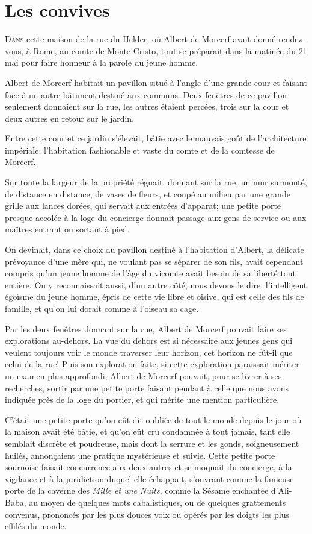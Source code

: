 \chapter{Les convives}

\lettrine{D}{ans} cette maison de la rue du Helder, où Albert de Morcerf avait donné rendez-vous, à Rome, au comte de Monte-Cristo, tout se préparait dans la matinée du 21 mai pour faire honneur à la parole du jeune homme. 

Albert de Morcerf habitait un pavillon situé à l'angle d'une grande cour et faisant face à un autre bâtiment destiné aux communs. Deux fenêtres de ce pavillon seulement donnaient sur la rue, les autres étaient percées, trois sur la cour et deux autres en retour sur le jardin. 

Entre cette cour et ce jardin s'élevait, bâtie avec le mauvais goût de l'architecture impériale, l'habitation fashionable et vaste du comte et de la comtesse de Morcerf. 

Sur toute la largeur de la propriété régnait, donnant sur la rue, un mur surmonté, de distance en distance, de vases de fleurs, et coupé au milieu par une grande grille aux lances dorées, qui servait aux entrées d'apparat; une petite porte presque accolée à la loge du concierge donnait passage aux gens de service ou aux maîtres entrant ou sortant à pied. 

On devinait, dans ce choix du pavillon destiné à l'habitation d'Albert, la délicate prévoyance d'une mère qui, ne voulant pas se séparer de son fils, avait cependant compris qu'un jeune homme de l'âge du vicomte avait besoin de sa liberté tout entière. On y reconnaissait aussi, d'un autre côté, nous devons le dire, l'intelligent égoïsme du jeune homme, épris de cette vie libre et oisive, qui est celle des fils de famille, et qu'on lui dorait comme à l'oiseau sa cage. 

Par les deux fenêtres donnant sur la rue, Albert de Morcerf pouvait faire ses explorations au-dehors. La vue du dehors est si nécessaire aux jeunes gens qui veulent toujours voir le monde traverser leur horizon, cet horizon ne fût-il que celui de la rue! Puis son exploration faite, si cette exploration paraissait mériter un examen plus approfondi, Albert de Morcerf pouvait, pour se livrer à ses recherches, sortir par une petite porte faisant pendant à celle que nous avons indiquée près de la loge du portier, et qui mérite une mention particulière. 

C'était une petite porte qu'on eût dit oubliée de tout le monde depuis le jour où la maison avait été bâtie, et qu'on eût cru condamnée à tout jamais, tant elle semblait discrète et poudreuse, mais dont la serrure et les gonds, soigneusement huilés, annonçaient une pratique mystérieuse et suivie. Cette petite porte sournoise faisait concurrence aux deux autres et se moquait du concierge, à la vigilance et à la juridiction duquel elle échappait, s'ouvrant comme la fameuse porte de la caverne des \textit{Mille et une Nuits}, comme la Sésame enchantée d'Ali-Baba, au moyen de quelques mots cabalistiques, ou de quelques grattements convenus, prononcés par les plus douces voix ou opérés par les doigts les plus effilés du monde. 

